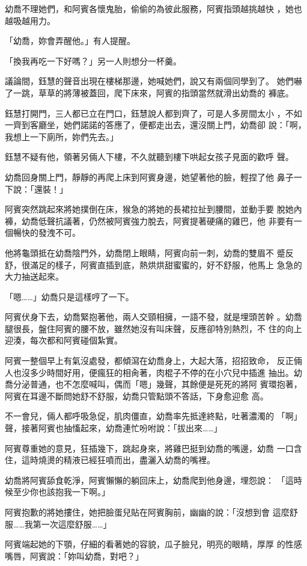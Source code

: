 幼喬不理她們，和阿賓各懷鬼胎，偷偷的為彼此服務，阿賓指頭越挑越快
，她也越吸越用力。

「幼喬，妳會弄醒他。」有人提醒。

「換我再吃一下好嗎？」另一人則想分一杯羹。

議論間，鈺慧的聲音出現在樓梯那邊，她喊她們，說又有兩個同學到了。
她們嚇了一跳，草草的將薄被蓋回，爬下床來，阿賓的指頭當然就滑出幼喬的
褲底。

鈺慧打開門，三人都已立在門口，鈺慧說人都到齊了，可是人多房間太小
，不如一齊到客廳坐，她們諾諾的答應了，便都走出去，還沒關上門，幼喬卻
說：「啊，我想上一下廁所，妳們先去。」

鈺慧不疑有他，領著另倆人下樓，不久就聽到樓下哄起女孩子見面的歡呼
聲。

幼喬回身關上門，靜靜的再爬上床到阿賓身邊，她望著他的臉，輕捏了他
鼻子一下說：「還裝！」

阿賓突然跳起來將她撲倒在床，猴急的將她的長裙拉扯到腰間，並動手要
脫她內褲，幼喬低聲抗議著，仍然被阿賓強力脫去，阿賓提著硬痛的雞巴，他
非要有一個暢快的發洩不可。

他將龜頭抵在幼喬陰門外，幼喬閉上眼睛，阿賓向前一刺，幼喬的雙眉不
蹙反舒，很滿足的樣子，阿賓直插到底，熱烘烘甜蜜蜜的，好不舒服，他馬上
急急的大力抽送起來。

「嗯……」幼喬只是這樣哼了一下。

阿賓伏身下去，幼喬緊抱著他，兩人交頸相擁，一語不發，就是埋頭苦幹
。幼喬腿很長，盤住阿賓的腰不放，雖然她沒有叫床聲，反應卻特別熱烈，不
住的向上迎湊，每次都和阿賓碰個紮實。

阿賓一整個早上有氣沒處發，都傾瀉在幼喬身上，大起大落，招招致命，
反正倆人也沒多少時間好用，便瘋狂的相肏著，肉棍子不停的在小穴兒中插進
抽出。幼喬分泌普通，也不怎麼喊叫，偶而「嗯」幾聲，其餘便是死死的將阿
賓環抱著，阿賓在耳邊不斷問她舒不舒服，幼喬只管點頭不答話，下身愈迎愈
高。

不一會兒，倆人都呼吸急促，肌肉僵直，幼喬率先抵達終點，吐著濃濁的
「啊」聲，接著阿賓也抽慉起來，幼喬連忙吩咐說：「拔出來……」

阿賓尊重她的意見，狂插幾下，跳起身來，將雞巴挺到幼喬的嘴邊，幼喬
一口含住，這時燒燙的精液已經狂噴而出，盡灑入幼喬的嘴裡。

幼喬將阿賓舔食乾淨，阿賓懶懶的躺回床上，幼喬爬到他身邊，埋怨說：
「這時候至少你也該抱我一下啊。」

阿賓抱歉的將她摟住，她把臉蛋兒貼在阿賓胸前，幽幽的說：「沒想到會
這麼舒服……我第一次這麼舒服……」

阿賓端起她的下顎，仔細的看著她的容貌，瓜子臉兒，明亮的眼睛，厚厚
的性感嘴唇，阿賓說：「妳叫幼喬，對吧？」

